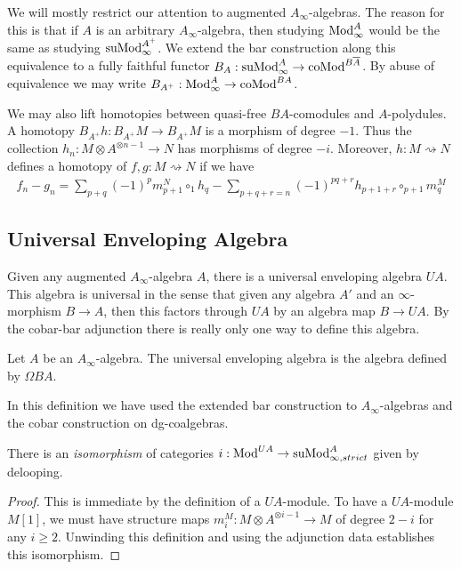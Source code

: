 \documentclass[../thesis.tex]{subfiles}
\begin{document}
            We will mostly restrict our attention to augmented $A_\infty$-algebras. The reason for this is that if $A$ is an arbitrary $A_\infty$-algebra, then studying $\tt{Mod}_\infty^A$ would be the same as studying $\tt{suMod}_\infty^{A^+}$. We extend the bar construction along this equivalence to a fully faithful functor $B_A : \tt{suMod}_\infty^A \rightarrow \tt{coMod}^{B\overline{A}}$. By abuse of equivalence we may write $B_{A^+} : \tt{Mod}_\infty^A \rightarrow \tt{coMod}^{BA}$.

            We may also lift homotopies between quasi-free $BA$-comodules and $A$-polydules. A homotopy $B_{A^+}h : B_{A^+}M \rightarrow B_{A^+}M$ is a morphism of degree $-1$. Thus the collection $h_n : M \otimes A^{\otimes n-1} \rightarrow N$ has morphisms of degree $-i$. Moreover, $h : M \rightsquigarrow N$ defines a homotopy of $f, g : M \rightsquigarrow N$ if we have
            \begin{align*}
                f_n - g_n = \sum_{p+q}(-1)^{p}m^N_{p+1}\circ_1 h_q - \sum_{p+q+r = n}(-1)^{pq+r}h_{p+1+r}\circ_{p+1} m^M_q
            \end{align*}

        \subsection{Universal Enveloping Algebra}

            Given any augmented $A_\infty$-algebra $A$, there is a universal enveloping algebra $UA$. This algebra is universal in the sense that given any algebra $A'$ and an $\infty$-morphism  $B \rightarrow A$, then this factors through $UA$ by an algebra map $B \rightarrow UA$. By the cobar-bar adjunction there is really only one way to define this algebra.

            \begin{definition}
                Let $A$ be an $A_\infty$-algebra. The universal enveloping algebra is the algebra defined by $\Omega BA$.
            \end{definition}
            \begin{remark}
                In this definition we have used the extended bar construction to $A_\infty$-algebras and the cobar construction on dg-coalgebras.
            \end{remark}

            \begin{lemma}\label{lem: Polydules-are-modules}
                There is an \textit{isomorphism} of categories $i : \tt{Mod}^{UA} \rightarrow \tt{suMod}_{\infty, strict}^{A}$ given by delooping.
            \end{lemma}
            \begin{proof}
                This is immediate by the definition of a $UA$-module. To have a $UA$-module $M[1]$, we must have structure maps $m_i^M : M \otimes A^{\otimes i-1} \rightarrow M$ of degree $2-i$ for any $i \geq 2$. Unwinding this definition and using the adjunction data establishes this isomorphism.
            \end{proof}
\end{document}
